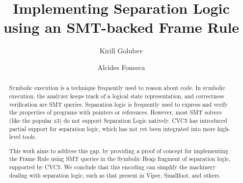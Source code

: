 \documentclass[sigplan,screen,review]{acmart}
\begin{document}
\title{Implementing Separation Logic using an SMT-backed Frame Rule}

\author{Kirill Golubev}
\author{Alcides Fonseca}

\begin{abstract}

Symbolic execution is a technique frequently used to reason about code. In symbolic execution, the analyzer keeps track of a logical state representation, and correctness verification are SMT queries. Separation logic is frequently used to express and verify the properties of programs with pointers or references. However, most SMT solvers (like the popular z3\cite{moura2008z3}) do not support Separation Logic natively. CVC5 has introduced partial support for separation logic, which has not yet been integrated into more high-level tools.

This work aims to address this gap, by providing a proof of concept for implementing the Frame Rule using SMT queries in the Symbolic Heap fragment of separation logic, supported by CVC5. We conclude that this encoding can simplify the machinery dealing with separation logic, such as that present in Viper, Smallfoot, and others.


\end{abstract}
\end{document}
